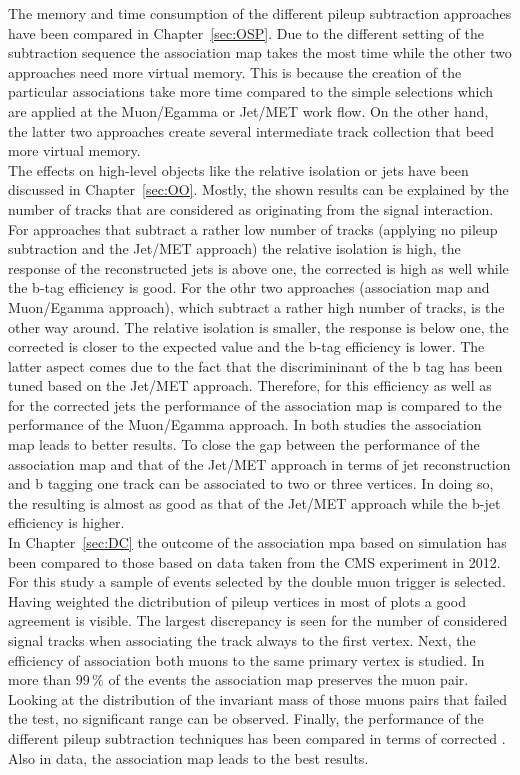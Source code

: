 The memory and time consumption of the different pileup subtraction approaches have been compared in Chapter~\ref{sec:OSP}. Due to the different setting of the subtraction sequence the association map takes the most time while the other two approaches need more virtual memory. This is because the creation of the particular associations take more time compared to the simple selections which are applied at the Muon/Egamma or Jet/MET work flow. On the other hand, the latter two approaches create several intermediate track collection that beed more virtual memory. \\
The effects on high-level objects like the relative isolation or jets have been discussed in Chapter~\ref{sec:OO}. Mostly, the shown results can be explained by the number of tracks that are considered as originating from the signal interaction. For approaches that subtract a rather low number of tracks (applying no pileup subtraction and the Jet/MET approach) the relative isolation is high, the \pt{} response of the reconstructed jets is above one, the corrected \MET{} is high as well while the b-tag efficiency is good. For the othr two approaches (association map and Muon/Egamma approach), which subtract a rather high number of tracks, is the other way around. The relative isolation is smaller, the \pt response is below one, the corrected \MET{} is closer to the expected value and the b-tag efficiency is lower. The latter aspect comes due to the fact that the discrimininant of the b tag has been tuned based on the Jet/MET approach. Therefore, for this efficiency as well as for the corrected jets the performance of the association map is compared to the performance of the Muon/Egamma approach. In both studies the association map leads to better results. To close the gap between the performance of the association map and that of the Jet/MET approach in terms of jet reconstruction and b tagging one track can be associated to two or three vertices. In doing so, the resulting \pt{} is almost as good as that of the Jet/MET approach while the b-jet efficiency is higher. \\
In Chapter~\ref{sec:DC} the outcome of the association mpa based on simulation has been compared to those based on data taken from the CMS experiment in 2012. For this study a sample of events selected by the double muon trigger is selected. Having weighted the dictribution of pileup vertices in most of plots a good agreement is visible. The largest discrepancy is seen for the number of considered signal tracks when associating the track always to the first vertex. Next, the efficiency of association both muons to the same primary vertex is studied. In more than $99\,\%$ of the events the association map preserves the muon pair. Looking at the distribution of the invariant mass of those muons pairs that failed the test, no significant range can be observed. Finally, the performance of the different pileup subtraction techniques has been compared in terms of corrected \MET{}. Also in data, the association map leads to the best results. \\
